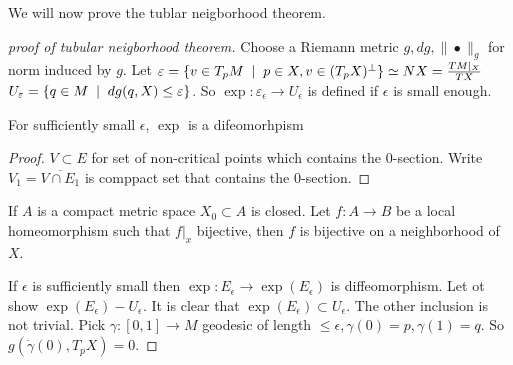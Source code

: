 We will now prove the tublar neigborhood theorem.
\begin{proof}
	[proof of tubular neigborhood theorem]
Choose a Riemann metric $g, dg, \|\bullet\|_g$ for norm induced by $g$.
Let $\varepsilon = \{v \in  T_p M \st p \in X, v \in (T_pX)^{\perp}\} \simeq NX = \frac{TM|_X}{TX} $
$U_\epsilon = \{q \in M \st dg(q, X) \le \epsilon\} $.
So $\exp: \varepsilon_\epsilon  \to U_\epsilon$ is defined if $\epsilon$ is small enough. 
\begin{lemma}
	For sufficiently small $\epsilon$, $\exp$ is a difeomorhpism
\end{lemma}
\begin{proof}
	$V \subset E$ for set of non-critical points which contains the $0$-section.
	Write $V_1 = \overline{V\cap E_1}$ is comppact set that contains the $0$-section.
\end{proof}
\begin{lemma}
	If $A$ is a compact metric space $X_0 \subset A$ is closed. Let $f: A \to B$ be a local homeomorphism such that $f|_x $ bijective, then $f$ is bijective on a neighborhood of $X$.
\end{lemma}
If $\epsilon$ is sufficiently small then $\exp: E_\epsilon \to \exp(E_\epsilon) $ is diffeomorphism. 
Let ot show $\exp(E_\epsilon) - U_\epsilon$. 
It is clear that $\exp(E_\epsilon) \subset U_\epsilon$. 
The other inclusion is not trivial. 
Pick $\gamma:[0,1] \to M$ geodesic of length $\le \epsilon, \gamma(0) = p, \gamma(1) = q$. 
So $g(\dot\gamma\left( 0 \right) , T_pX) = 0$. 
\end{proof}


